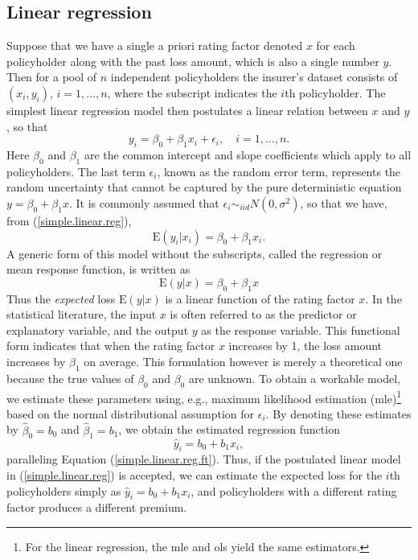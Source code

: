 \documentclass[12pt]{article}
\def\E{\mathrm{E}}
\begin{document}
\subsection{Linear regression}
Suppose that we have a single a priori rating factor denoted $x$ for each policyholder along with the past loss amount, which is also a single number $y$. Then for a pool of $n$ independent policyholders the insurer's dataset consists of $(x_i, y_i)$, $i=1, \ldots,n$, where the subscript indicates the $i$th policyholder. The simplest linear regression model then postulates a linear relation between $x$ and $y$, so that 
\begin{equation}
\label{simple.linear.reg}
y_i=\beta_0+\beta_1x_i+\epsilon_i, \quad i=1, \ldots,n.
\end{equation}
Here $\beta_0$ and $\beta_1$ are the common intercept and slope coefficients which apply to all policyholders. The last term $\epsilon_i$, known as the random error term, represents the random uncertainty that cannot be captured by the pure deterministic equation $y=\beta_0+\beta_1x$.  It is commonly assumed that $\epsilon_i \sim_{iid} N(0, \sigma^2)$, so that we have, from (\ref{simple.linear.reg}),
\begin{equation}
\label{simple.linear.reg.ft}
\E(y_i|x_i)=\beta_0+\beta_1x_i.
\end{equation} A generic form of this model without the subscripts, called the regression or mean response function, is written as
\begin{equation}
\label{simple.linear.reg.ft2}
\E(y|x)=\beta_0+\beta_1x
\end{equation}
Thus the \textit{expected} loss $\E(y|x)$ is a linear function of the rating factor $x$. In the statistical literature, the input $x$ is often referred to as the predictor or explanatory variable, and the output $y$ as the response variable. This functional form indicates that when the rating factor $x$ increases by 1, the loss amount increases by $\beta_1$ on average. This formulation however is merely a theoretical one because the true values of $\beta_0$ and $ \beta_0$ are unknown. To obtain a workable model, we estimate these parameters using, e.g., maximum likelihood estimation (mle)\footnote{For the linear regression, the mle and ols yield the same estimators. } based on the normal distributional assumption for $\epsilon_i$. By denoting these estimates by $\hat{\beta}_0=b_0$ and $\hat{\beta}_1=b_1$, we obtain the estimated regression function 
\begin{equation}
\label{y.hat.simple.reg}
\hat{y}_i=b_0+b_1x_i,
\end{equation} paralleling Equation (\ref{simple.linear.reg.ft}). Thus, if the postulated linear model in (\ref{simple.linear.reg}) is accepted, we can estimate the expected loss for the $i$th policyholders simply as $\hat{y}_i=b_0+b_1x_i$, and policyholders with a different rating factor produces a different premium.
\end{document}
